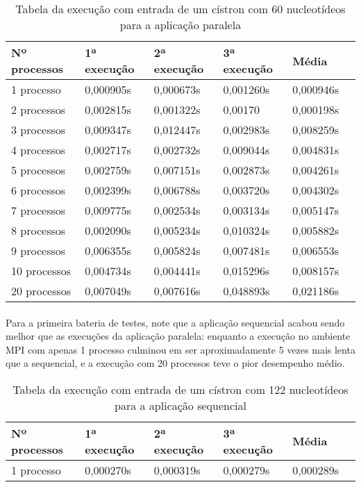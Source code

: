 \documentclass[a4paper,10pt]{article}
\begin{document}
\begin{table}[!htb]
\begin{tabular}{| l | l | l | l | l | p{5cm} |} 
\hline
  Nº processos & 1ª execução & 2ª execução & 3ª execução & Média\\ \hline
1 processo   &	0,000905s &    0,000673s    & 0,001260s  &  0,000946s \\ \hline
2 processos &	0,002815s  &    0,001322s    & 0,00170    &  0,000198s\\ \hline
3 processos & 0,009347s  &  0,012447s  &  0,002983s  &  0,008259s  \\ \hline
4 processos & 0,002717s  &  0,002732s  &  0,009044s  &  0,004831s  \\ \hline
5 processos & 0,002759s  &  0,007151s  &  0,002873s  &  0,004261s  \\ \hline
6 processos & 0,002399s  &  0,006788s  &  0,003720s  &  0,004302s  \\ \hline
7 processos & 0,009775s  & 0,002534s  &  0,003134s  &  0,005147s\\ \hline
8 processos & 0,002090s  &  0,005234s  &  0,010324s  &  0,005882s  \\ \hline
9 processos & 0,006355s  &  0,005824s  &  0,007481s  &  0,006553s \\ \hline
10 processos & 0,004734s  &  0,004441s  &  0,015296s  &  0,008157s \\ \hline
20 processos & 0,007049s  &  0,007616s  &  0,048893s  &  0,021186s \\ \hline 
\end{tabular}
\caption{Tabela da execução com entrada de um cístron com 60 nucleotídeos para a aplicação paralela}
\end{table}

\paragraph{} Para a primeira bateria de testes, note que a aplicação sequencial acabou sendo melhor que as execuções da aplicação paralela: enquanto a execução no ambiente MPI com apenas 1 processo culminou em ser aproximadamente 5 vezes mais lenta que a sequencial, e a execução com 20 processos teve o pior desempenho médio.\\
\newpage
\begin{table}[!htb]
\begin{tabular}{| l | l | l | l | l | p{5cm} |} 
\hline
  Nº processos & 1ª execução & 2ª execução & 3ª execução & Média\\ \hline
1 processo   &	0,000270s  &    0,000319s   & 0,000279s   &  0,000289s\\ \hline

\end{tabular}
\caption{Tabela da execução com entrada de um cístron com 122 nucleotídeos para a aplicação sequencial}
\end{table}
\end{document}
